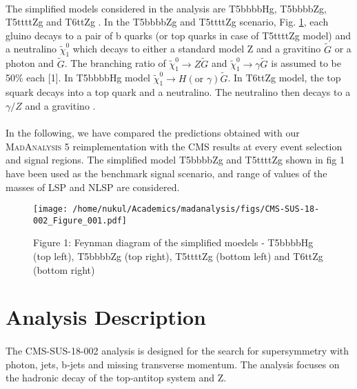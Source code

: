 \documentclass[a4paper, 10pt]{article}
\begin{document}
\paragraph{}
The simplified models considered in the analysis are T5bbbbHg, T5bbbbZg, T5ttttZg and T6ttZg \cite{paper}. In the T5bbbbZg and T5ttttZg scenario, Fig. \ref{Figure 1:}, each gluino decays to a pair of b quarks (or top quarks in case of T5ttttZg model) and a neutralino $\tilde{\chi}_{1}^{0}$ which decays to either a standard model Z and a gravitino $\tilde{G}$ or a photon and $\tilde{G}$. The branching ratio of $\tilde{\chi}_{1}^{0} \to Z \tilde{G}$ and $\tilde{\chi}_{1}^{0} \to \gamma \tilde{G}$ is assumed to be 50\% each [1]. In T5bbbbHg model $\tilde{\chi}_{1}^{0} \to H(\text{or } \gamma) \tilde{G}$. In T6ttZg model, the top squark decays into a top quark and a neutralino. The neutralino then decays to a $\gamma / Z$ and a gravitino \cite{paper}.   
\\
\paragraph{}
In the following, we have compared the predictions obtained with our \textsc{MadAnalysis 5} \cite{madanalysis1,madanalysis2,madanalysis3} reimplementation with the CMS results at every event selection and signal regions. The simplified model T5bbbbZg and T5ttttZg shown in fig 1 have been used as the benchmark signal scenario, and range of values of the masses of LSP and NLSP are considered.     

\begin{figure}[h]
\centering 
\texttt{[image: /home/nukul/Academics/madanalysis/figs/CMS-SUS-18-002\_Figure\_001.pdf]}
\caption{Figure 1: Feynman diagram of the simplified moedels - T5bbbbHg (top left), T5bbbbZg (top right), T5ttttZg (bottom left) and T6ttZg (bottom right) }
\label{Figure 1:}
\end{figure}

\section{Analysis Description}
\paragraph{}
The CMS-SUS-18-002 analysis is designed for the search for supersymmetry with photon, jets, b-jets and missing transverse momentum. The analysis focuses on the hadronic decay of the top-antitop system and Z. 
\end{document}
